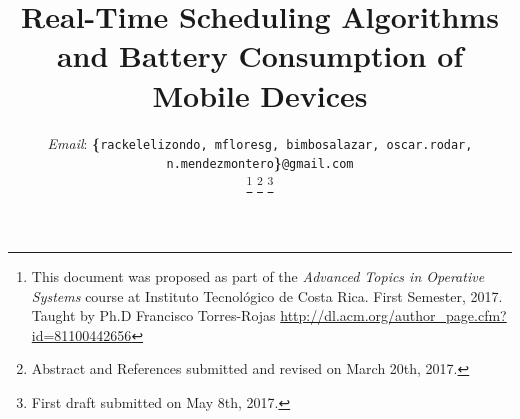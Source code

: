 \documentclass[10pt,article]{IEEEtran}
\begin{document}
%
\title{Real-Time Scheduling Algorithms and Battery Consumption of Mobile Devices}
%
%
%
%


\author{
\vspace{0.1cm}
\small{\emph{Email}: \textbf{\{}\texttt{rackelelizondo, mfloresg, bimbosalazar, oscar.rodar, n.mendezmontero}\textbf{\}}\texttt{@gmail.com}}

\thanks{This document was proposed as part of the \emph{Advanced Topics in Operative Systems} course at Instituto Tecnológico de Costa Rica. First Semester, 2017. Taught by Ph.D Francisco Torres-Rojas \url{http://dl.acm.org/author_page.cfm?id=81100442656}} 
\thanks{Abstract and References submitted and revised on March 20th, 2017.}
\thanks{First draft submitted on May 8th, 2017.}
}
\end{document}
